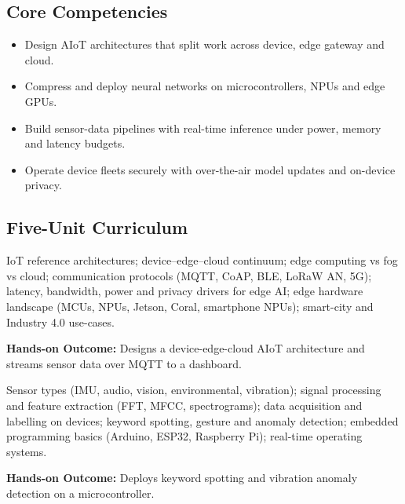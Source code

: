 \documentclass[10pt,a4paper]{article}
\begin{document}
\subsection*{Core Competencies}\begin{itemize}\small
\item Design AIoT architectures that split work across device, edge gateway and cloud.
\item Compress and deploy neural networks on microcontrollers, NPUs and edge GPUs.
\item Build sensor-data pipelines with real-time inference under power, memory and latency budgets.
\item Operate device fleets securely with over-the-air model updates and on-device privacy.
\end{itemize}
\subsection*{Five-Unit Curriculum}
\begin{tcolorbox}[unitbox,title={{\color{gold}UNIT I}\quad AIoT Architecture and Edge Computing\hfill{\color{gold}9 Hours}}]\small IoT reference architectures; device–edge–cloud continuum; edge computing vs fog vs cloud; communication protocols (MQTT, CoAP, BLE, LoRaW AN, 5G); latency, bandwidth, power and privacy drivers for edge AI; edge hardware landscape (MCUs, NPUs, Jetson, Coral, smartphone NPUs); smart-city and Industry 4.0 use-cases.\par\vspace{2pt}\par\textbf{Hands-on Outcome:} Designs a device-edge-cloud AIoT architecture and streams sensor data over MQTT to a dashboard.\end{tcolorbox}
\begin{tcolorbox}[unitbox,title={{\color{gold}UNIT II}\quad Sensor Data and Embedded ML\hfill{\color{gold}9 Hours}}]\small Sensor types (IMU, audio, vision, environmental, vibration); signal processing and feature extraction (FFT, MFCC, spectrograms); data acquisition and labelling on devices; keyword spotting, gesture and anomaly detection; embedded programming basics (Arduino, ESP32, Raspberry Pi); real-time operating systems.\par\vspace{2pt}\par\textbf{Hands-on Outcome:} Deploys keyword spotting and vibration anomaly detection on a microcontroller.\end{tcolorbox}
\end{document}
